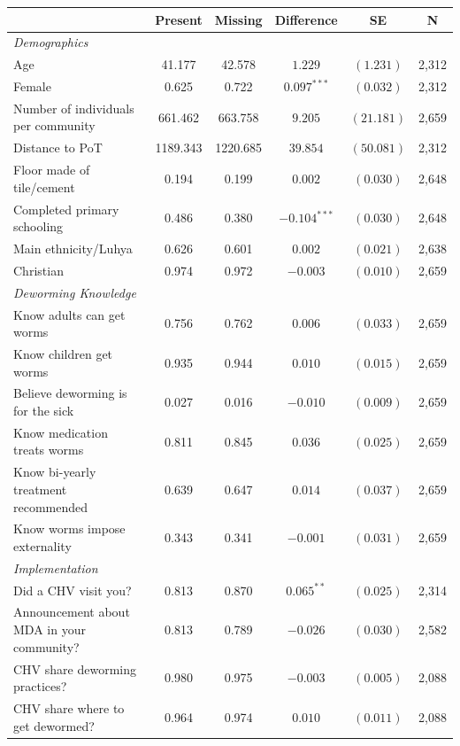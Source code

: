 \centering
\begin{tabular}{l ccccc}
\hline\hline
 & \multicolumn{1}{c}{Present} & \multicolumn{1}{c}{Missing} & \multicolumn{1}{c}{Difference} & \multicolumn{1}{c}{SE} & \multicolumn{1}{c}{N} \\
\hline
\addlinespace
\textit{Demographics} \\
\addlinespace
Age & 41.177 & 42.578 & $1.229$ & $(1.231)$ & 2,312 \\
Female & 0.625 & 0.722 & $0.097^{***}$ & $(0.032)$ & 2,312 \\
Number of individuals per community & 661.462 & 663.758 & $9.205$ & $(21.181)$ & 2,659 \\
Distance to PoT & 1189.343 & 1220.685 & $39.854$ & $(50.081)$ & 2,312 \\
Floor made of tile/cement & 0.194 & 0.199 & $0.002$ & $(0.030)$ & 2,648 \\
Completed primary schooling & 0.486 & 0.380 & $-0.104^{***}$ & $(0.030)$ & 2,648 \\
Main ethnicity/Luhya & 0.626 & 0.601 & $0.002$ & $(0.021)$ & 2,638 \\
Christian & 0.974 & 0.972 & $-0.003$ & $(0.010)$ & 2,659 \\
\addlinespace
\textit{Deworming Knowledge} \\
\addlinespace
Know adults can get worms & 0.756 & 0.762 & $0.006$ & $(0.033)$ & 2,659 \\
Know children get worms & 0.935 & 0.944 & $0.010$ & $(0.015)$ & 2,659 \\
Believe deworming is for the sick & 0.027 & 0.016 & $-0.010$ & $(0.009)$ & 2,659 \\
Know medication treats worms & 0.811 & 0.845 & $0.036$ & $(0.025)$ & 2,659 \\
Know bi-yearly treatment recommended & 0.639 & 0.647 & $0.014$ & $(0.037)$ & 2,659 \\
Know worms impose externality & 0.343 & 0.341 & $-0.001$ & $(0.031)$ & 2,659 \\
\addlinespace
\textit{Implementation} \\
\addlinespace
Did a CHV visit you? & 0.813 & 0.870 & $0.065^{**}$ & $(0.025)$ & 2,314 \\
Announcement about MDA in your community? & 0.813 & 0.789 & $-0.026$ & $(0.030)$ & 2,582 \\
CHV share deworming practices? & 0.980 & 0.975 & $-0.003$ & $(0.005)$ & 2,088 \\
CHV share where to get dewormed? & 0.964 & 0.974 & $0.010$ & $(0.011)$ & 2,088 \\
\hline\hline
\end{tabular}
